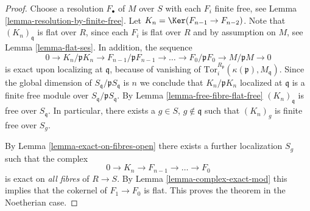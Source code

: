 \begin{proof}
\medskip\noindent
Choose a resolution $F_\bullet$ of $M$ over $S$ with each
$F_i$ finite free, see Lemma \ref{lemma-resolution-by-finite-free}.
Let $K_n = \Ker(F_{n-1} \to F_{n-2})$. Note that
$(K_n)_{\mathfrak q}$ is flat over $R$, since each $F_i$
is flat over $R$ and by assumption on $M$, see Lemma
\ref{lemma-flat-ses}. In addition, the sequence
$$
0 \to
K_n/\mathfrak p K_n \to
F_{n-1}/ \mathfrak p F_{n-1} \to
\ldots \to
F_0 / \mathfrak p F_0 \to
M/\mathfrak p M \to
0
$$
is exact upon localizing at $\mathfrak q$, because of vanishing
of $\text{Tor}_i^{R_\mathfrak p}(\kappa(\mathfrak p), M_{\mathfrak q})$.
Since the global dimension of $S_\mathfrak q/\mathfrak p S_{\mathfrak q}$
is $n$ we conclude that $K_n / \mathfrak p K_n$ localized
at $\mathfrak q$ is a finite free module over
$S_\mathfrak q/\mathfrak p S_{\mathfrak q}$. By
Lemma \ref{lemma-free-fibre-flat-free} $(K_n)_{\mathfrak q}$
is free over $S_{\mathfrak q}$. In particular, there exists a
$g \in S$, $g \not \in \mathfrak q$ such that $(K_n)_g$
is finite free over $S_g$.

\medskip\noindent
By Lemma \ref{lemma-exact-on-fibres-open}
there exists a further localization $S_g$ such that
the complex
$$
0 \to K_n \to F_{n-1} \to \ldots \to F_0
$$
is exact on {\it all fibres} of $R \to S$. By
Lemma \ref{lemma-complex-exact-mod}
this implies that the cokernel of $F_1 \to F_0$ is
flat. This proves the theorem in the Noetherian case.
\end{proof}
